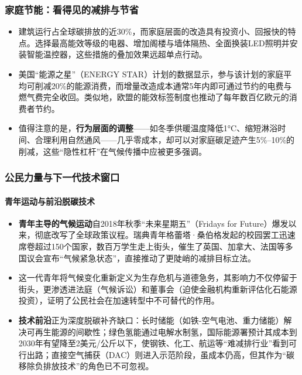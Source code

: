 \documentclass[11pt]{beamer}
\begin{document}
\begin{frame}
\frametitle{家庭节能：看得见的减排与节省}
\begin{itemize}
    \item 建筑运行占全球碳排放的近30\%，而家庭层面的改造具有\alert{投资小、回报快}的特点。选择\alert{最高能效等级的电器}、增加阁楼与墙体隔热、全面换装LED照明并安装智能温控器，这些措施的叠加效果远超单点行动。
    \item 美国“能源之星”（ENERGY STAR）计划的数据显示，参与该计划的家庭平均可削减\alert{20\%的能源消费}，而增量改造成本通常\alert{5年内即可通过节约的电费与燃气费完全收回}。类似地，欧盟的能效标签制度也推动了每年数百亿欧元的消费者节约。
    \item 值得注意的是，\textbf{行为层面的调整}——如冬季供暖温度降低1°C、缩短淋浴时间、合理利用自然通风——几乎零成本，却可以对家庭碳足迹产生5\%--10\%的削减，这些“隐性杠杆”在气候传播中应被更多强调。
\end{itemize}
\end{frame}

\begin{frame}
\frametitle{公民力量与下一代技术窗口}
\framesubtitle{青年运动与前沿脱碳技术}
\begin{itemize}
    \item \textbf{青年主导的气候运动}自2018年秋季“未来星期五”（Fridays for Future）爆发以来，彻底改写了全球政策议程。瑞典青年格蕾塔·桑伯格发起的校园罢工迅速席卷\alert{超过150个国家}，数百万学生走上街头，催生了英国、加拿大、法国等多国议会宣布\alert{“气候紧急状态”}，直接推动了更陡峭的减排目标立法。
    \item 这一代青年将气候变化重新定义为\alert{生存危机与道德急务}，其影响力不仅停留于街头，更渗透进法庭（气候诉讼）和董事会（迫使金融机构重新评估化石能源投资），证明了公民社会在加速转型中不可替代的作用。
    \item \textbf{技术前沿}正为深度脱碳补齐缺口：\alert{长时储能}（如铁-空气电池、重力储能）解决可再生能源的间歇性；\alert{绿色氢能}通过电解水制氢，国际能源署预计其成本到2030年有望降至2美元/公斤以下，使钢铁、化工、航运等“难减排行业”看到可行出路；\alert{直接空气捕获（DAC）}则进入示范阶段，虽成本仍高，但其作为“碳移除负排放技术”的角色已不可忽视。
\end{itemize}
\end{frame}
\end{document}
